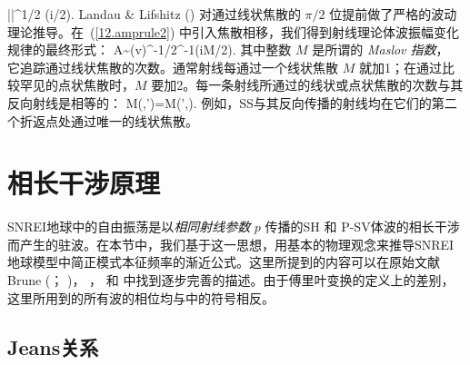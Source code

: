 \left|\right|^{1/2}
\exp(i\pi/2).
\en
Landau \& Lifshitz (\citeyear{landau&lifshitz71}) 对通过线状焦散的
$\pi/2$ 位提前做了严格的波动理论推导。在~(\ref{12.amprule2}) 中引入焦散相移，我们得到射线理论体波振幅变化规律的最终形式：
\eq \label{12.amprule3}
A\sim(\rho v)^{-1/2}\Pi\sR^{-1}\exp(iM\pi/2).
\en
其中整数 $M$ 是所谓的 {\em Maslov 指数\/}，
%
%
它追踪通过线状焦散的次数。通常射线每通过一个线状焦散
$M$ 就加1；在通过比较罕见的点状焦散时，$M$ 要加2。每一条射线所通过的线状或点状焦散的次数与其反向射线是相等的：
\eq \label{12.Maslovsymm}
M(\bx,\bx')=M(\bx',\bx).
\en
例如，SS与其反向传播的射线均在它们的第二个折返点处通过唯一的线状焦散。
%
%
%
%
%
%

\section{相长干涉原理}
%

SNREI地球中的自由振荡是以{\em 相同射线参数\/} $p$ 传播的SH 和 P-SV体波的相长干涉而产生的驻波。在本节中，我们基于这一思想，用基本的物理观念来推导SNREI地球模型中简正模式本征频率的渐近公式。这里所提到的内容可以在原始文献
Brune (\citeyear{brune64}； \citeyear{brune66})， \textcite{odaka78}，
\textcite{levshin81} 和 \textcite{zhao&dahlen93}中找到逐步完善的描述。由于傅里叶变换的定义上的差别，这里所用到的所有波的相位均与\textcite{zhao&dahlen93}中的符号相反。

\subsection{Jeans关系}
%

